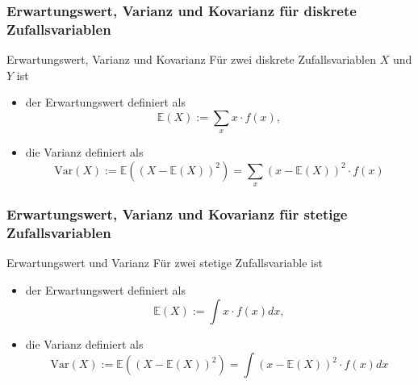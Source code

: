 \begin{frame}
\frametitle{Erwartungswert, Varianz und Kovarianz für diskrete Zufallsvariablen}
\begin{block}{Erwartungswert, Varianz und Kovarianz}
Für zwei diskrete Zufallsvariablen $X$ und $Y$ ist
\begin{itemize}[<+->]
\item der Erwartungswert definiert als
\[ \mathbb{E}(X) := \sum_x x\cdot f(x),
\]
\item die Varianz definiert als \[
\text{Var}(X) := \mathbb{E}\left(\left(X-\mathbb{E}(X)\right)^2\right) = \sum_x \left( x-\mathbb{E}(X)\right)^2\cdot f(x)
\]
\end{itemize}
\end{block}
\end{frame}

\begin{frame}
\frametitle{Erwartungswert, Varianz und Kovarianz für stetige Zufallsvariablen}
\begin{block}{Erwartungswert und Varianz}
Für zwei stetige Zufallsvariable ist
\begin{itemize}[<+->]
\item der Erwartungswert definiert als
\[ \mathbb{E}(X) := \int x\cdot f(x) dx,
\]
\item die Varianz definiert als \[
\text{Var}(X) := \mathbb{E}\left(\left(X-\mathbb{E}(X)\right)^2\right) = \int \left( x-\mathbb{E}(X)\right)^2\cdot f(x) dx
\]
\end{itemize}
\end{block}
\end{frame}

